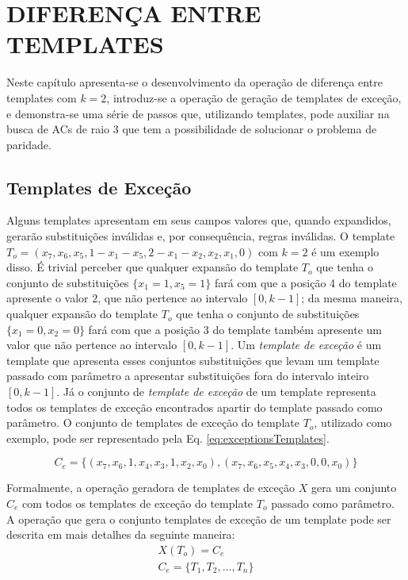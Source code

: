 \section{DIFERENÇA ENTRE TEMPLATES}
\label{sec:resultadosParciais}
Neste capítulo apresenta-se o desenvolvimento da operação de diferença entre templates com $k=2$, introduz-se a operação de geração de templates de exceção, e demonstra-se uma série de passos que, utilizando templates, pode auxiliar na busca de ACs de raio 3 que tem a possibilidade de solucionar o problema de paridade.

\subsection{Templates de Exceção}
Alguns templates apresentam em seus campos valores que, quando expandidos, gerarão substituições inválidas e, por consequência, regras inválidas. O template $T_o = (x_7, x_6, x_5, 1 - x_1 - x_5, 2 - x_1 - x_2, x_2, x_1, 0)$ com $k=2$ é um exemplo disso. É trivial perceber que qualquer expansão do template $T_o$ que tenha o conjunto de substituições $\{x_1 = 1, x_5 = 1\}$ fará com que a posição 4 do template apresente o valor $2$, que não pertence ao intervalo $[0,k-1]$; da mesma maneira, qualquer expansão do template $T_o$ que tenha o conjunto de substituições $\{x_1 = 0, x_2 = 0\}$ fará com que a posição 3 do template também apresente um valor que não pertence ao intervalo $[0,k-1]$. Um \textit{template de exceção} é um template que apresenta esses conjuntos substituições que levam um template passado com parâmetro a apresentar substituições fora do intervalo inteiro $[0, k-1]$. Já o conjunto de \textit{template de exceção} de um template representa todos os templates de exceção encontrados apartir do template passado como parâmetro. O conjunto de templates de exceção do template $T_o$, utilizado como exemplo, pode ser representado pela Eq. \ref{eq:exceptionsTemplates}.

\begin{equation}
C_e = \{(x_7, x_6, 1, x_4, x_3, 1, x_2, x_0),(x_7, x_6, x_5, x_4, x_3, 0, 0, x_0)\}
\label{eq:exceptionsTemplates}
\end{equation}

Formalmente, a operação geradora de templates de exceção $X$ gera um conjunto $C_e$ com todos os templates de exceção do template $T_o$ passado como parâmetro. A operação que gera o conjunto templates de exceção de um template pode ser descrita em mais detalhes da seguinte maneira:
\begin{equation}
\begin{split}
X(T_o)= C_e \\
C_e = \{T_1,T_2,\dots, T_n\}\\
\end{split}
\end{equation}

